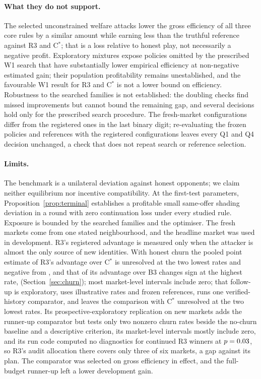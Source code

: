 \documentclass[11pt]{article}
\begin{document}
\paragraph{What they do not support.} The selected unconstrained welfare attacks lower the gross efficiency of all three core rules by a similar amount while earning less than the truthful reference against R3 and C$^*$; that is a loss relative to honest play, not necessarily a negative profit. Exploratory mixtures expose policies omitted by the prescribed W1 search that have substantially lower empirical efficiency at non-negative estimated gain; their population profitability remains unestablished, and the favourable W1 result for R3 and C$^*$ is not a lower bound on efficiency. Robustness to the searched families is not established: the doubling checks find missed improvements but cannot bound the remaining gap, and several decisions hold only for the prescribed search procedure. The fresh-market configurations differ from the registered ones in the last binary digit; re-evaluating the frozen policies and references with the registered configurations leaves every Q1 and Q4 decision unchanged, a check that does not repeat search or reference selection.
\paragraph{Limits.} The benchmark is a unilateral deviation against honest opponents; we claim neither equilibrium nor incentive compatibility. At the first-test parameters, Proposition~\ref{prop:terminal} establishes a profitable small same-offer shading deviation in a round with zero continuation loss under every studied rule. Exposure is bounded by the searched families and the optimiser. The fresh markets come from one stated neighbourhood, and the headline market was used in development. R3's registered advantage is measured only when the attacker is almost the only source of new identities. With honest churn the pooled point estimate of R3's advantage over C$^*$ is unresolved at the two lowest rates and negative from , and that of its advantage over B3 changes sign at the highest rate,  (Section~\ref{sec:churn}); most market-level intervals include zero; that follow-up is exploratory, uses illustrative rates and frozen references, runs one verified-history comparator, and leaves the comparison with C$^*$ unresolved at the two lowest rates. Its prospective-exploratory replication on new markets adds the runner-up comparator but tests only two nonzero churn rates beside the no-churn baseline and a descriptive criterion, its market-level intervals mostly include zero, and its run code computed no diagnostics for continued R3 winners at $p = 0.03$, so R3's audit allocation there covers only three of six markets, a gap against its plan. The comparator was selected on gross efficiency in effect, and the full-budget runner-up left a lower development gain.
\end{document}
